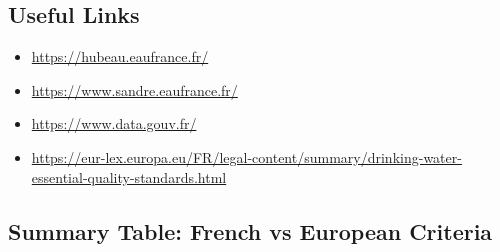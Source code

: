 \documentclass{article}
\begin{document}
\subsection{Useful Links}
\begin{itemize}
    \item \url{https://hubeau.eaufrance.fr/}
    \item \url{https://www.sandre.eaufrance.fr/}
    \item \url{https://www.data.gouv.fr/}
    \item \url{https://eur-lex.europa.eu/FR/legal-content/summary/drinking-water-essential-quality-standards.html}
\end{itemize}

\subsection{Summary Table: French vs European Criteria}
\end{document}
